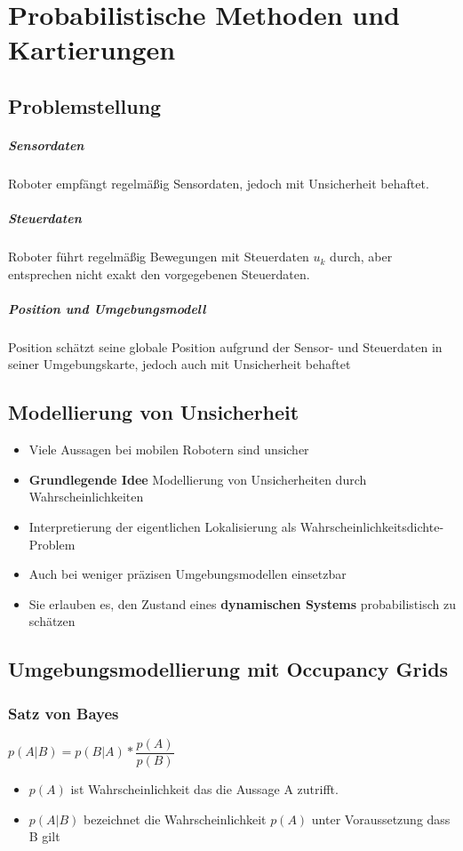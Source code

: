 \chapter{Probabilistische Methoden und Kartierungen}
\section{Problemstellung}
\paragraph{Sensordaten} 
Roboter empfängt regelmäßig Sensordaten, jedoch mit Unsicherheit behaftet.
\paragraph{Steuerdaten}
Roboter führt regelmäßig Bewegungen mit Steuerdaten $u_k$ durch, aber entsprechen nicht exakt den vorgegebenen Steuerdaten.
\paragraph{Position und Umgebungsmodell}
Position schätzt seine globale Position aufgrund der Sensor- und Steuerdaten in seiner Umgebungskarte, jedoch auch mit Unsicherheit behaftet
\section{Modellierung von Unsicherheit}
\begin{itemize}
	\item Viele Aussagen bei mobilen Robotern sind unsicher 
	\item \textbf{Grundlegende Idee} Modellierung von Unsicherheiten durch Wahrscheinlichkeiten
	\item Interpretierung der eigentlichen Lokalisierung als Wahrscheinlichkeitsdichte-Problem
	\item Auch bei weniger präzisen Umgebungsmodellen einsetzbar
	\item Sie erlauben es, den Zustand eines \textbf{dynamischen Systems} probabilistisch zu schätzen
\end{itemize}
\section{Umgebungsmodellierung mit Occupancy Grids}
\subsection{Satz von Bayes}
$p (A|B) = p(B|A) * \dfrac{p(A)}{p(B)}$
\begin{itemize}
	\item $p(A)$ ist Wahrscheinlichkeit das die Aussage A zutrifft.
	\item $p(A|B)$ bezeichnet die Wahrscheinlichkeit $p(A)$ unter Voraussetzung dass B gilt
\end{itemize}

